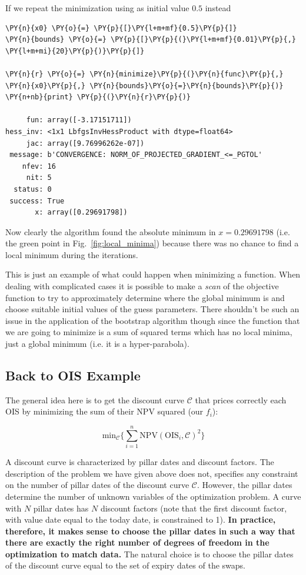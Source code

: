 If we repeat the minimization using as initial value $0.5$ instead
\begin{codebox}
\begin{Verbatim}[commandchars=\\\{\}]
\PY{n}{x0} \PY{o}{=} \PY{p}{[}\PY{l+m+mf}{0.5}\PY{p}{]}
\PY{n}{bounds} \PY{o}{=} \PY{p}{[}\PY{p}{(}\PY{l+m+mf}{0.01}\PY{p}{,} \PY{l+m+mi}{20}\PY{p}{)}\PY{p}{]}
		
\PY{n}{r} \PY{o}{=} \PY{n}{minimize}\PY{p}{(}\PY{n}{func}\PY{p}{,} \PY{n}{x0}\PY{p}{,} \PY{n}{bounds}\PY{o}{=}\PY{n}{bounds}\PY{p}{)}
\PY{n+nb}{print} \PY{p}{(}\PY{n}{r}\PY{p}{)}

     fun: array([-3.17151711])
hess_inv: <1x1 LbfgsInvHessProduct with dtype=float64>
     jac: array([9.76996262e-07])
 message: b'CONVERGENCE: NORM_OF_PROJECTED_GRADIENT_<=_PGTOL'
    nfev: 16
     nit: 5
  status: 0
 success: True
       x: array([0.29691798])
\end{Verbatim}
\end{codebox}
Now clearly the algorithm found the absolute minimum in $x=0.29691798$ (i.e. the green point in Fig.~\ref{fig:local_minima}) because there was no chance to find a local minimum during the iterations.

This is just an example of what could happen when minimizing a function.
When dealing with complicated cases it is possible to make a \emph{scan} of the objective 
function to try to approximately determine where the global minimum is and choose 
suitable initial values of the guess parameters.
There shouldn't be such an issue in the application of the bootstrap algorithm though since the function that we are going to minimize is a sum of squared terms which has no local minima, just a global minimum (i.e. it is a hyper-parabola).

\subsection{Back to OIS Example}\label{ois-example}
The general idea here is to get the discount curve \(\mathcal{C}\) that prices correctly 
each OIS by minimizing the sum of their NPV squared (our \(f_i\)):

\begin{equation}
\mathrm{min}_{\mathcal{C}} \Big\{\sum_{i=1}^{n}\mathrm{NPV}(\mathrm{OIS}_i, \mathcal{C})^2\Big\}
\end{equation}

A discount curve is characterized by pillar dates and discount factors. The description of the problem we have given above does not, specifies any constraint on the number of pillar dates of 
the discount curve \(\mathcal{C}\). However, the pillar dates determine the number of unknown variables of the optimization problem. A curve with \(N\) pillar dates has \(N\) discount factors (note that the first discount factor, with value date equal to the today date, is constrained to 1). \textbf{In practice, therefore, it makes sense to choose the pillar dates in such a way that 
	there are exactly the right number of degrees of freedom in the optimization to match data.} 
The natural choice is to choose the pillar dates of the discount curve equal to the set of expiry dates of the swaps.

